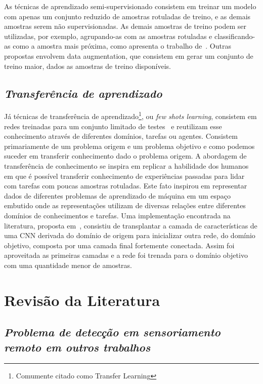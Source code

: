 As técnicas de aprendizado semi-supervisionado consistem em treinar um modelo com apenas um conjunto reduzido de amostras rotuladas de treino, e as demais amostras serem não supervisionadas. As demais amostras de treino podem ser utilizadas, por exemplo, agrupando-as com as amostras rotuladas e classificando-as como a amostra mais próxima, como apresenta o trabalho de~\cite{Sanches2003}. Outras propostas envolvem data augmentation, que consistem em gerar um conjunto de treino maior, dados as amostras de treino disponíveis.

\subsection{\textit{Transferência de aprendizado}}\label{sec:Cap2_transfer}

Já técnicas de transferência de aprendizado\footnote{Comumente citado como Transfer Learning}, ou \textit{few shots learning}, consistem em redes treinadas para um conjunto limitado de testes~\cite{rostami2019learning}
e reutilizam esse conhecimento através de diferentes domínios, tarefas ou agentes. Consistem primariamente de um problema origem e um problema objetivo e como podemos suceder em transferir conhecimento dado o problema origem. A abordagem de transferência de conhecimento se inspira em replicar a habilidade dos humanos em que é possível transferir conhecimento de experiências passadas para lidar com tarefas com poucas amostras rotuladas. Este fato inspirou em representar dados de diferentes problemas de aprendizado de máquina em um espaço embutido onde as representações utilizam de diversas relações entre diferentes domínios de conhecimentos e tarefas. Uma implementação encontrada na literatura, proposta em~\cite{DBLP:journals/corr/abs-1811-04863}, consistiu de transplantar a camada de características de uma CNN derivada do domínio de origem para inicializar outra rede, do domínio objetivo, composta por uma camada final fortemente conectada. Assim foi aproveitada as primeiras camadas e a rede foi trenada para o domínio objetivo com uma quantidade menor de amostras.



\section{Revisão da Literatura}\label{sec:Cap2_revisao_literatura}


\subsection{\textit{Problema de detecção em sensoriamento remoto em outros trabalhos}}\label{sec:Cap2_outros_trabalhos}


